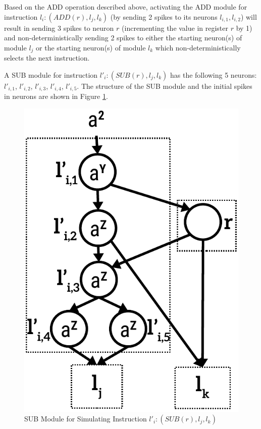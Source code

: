 \documentclass[smallextended]{svjour3}
\begin{document}
Based on the ADD operation described above, activating the ADD module for instruction $l_i:(ADD(r),l_j,l_k)$ (by sending 2 spikes to its neurons 
$l_{i,1}, l_{i,2}$) will result in sending $3$ spikes to neuron $r$ (incrementing the value in register $r$ by 1) and non-deterministically sending 2
spikes to either the starting neuron(s) of module $l_{j}$ or the starting neuron(s) of module $l_k$ which non-deterministically selects the next 
instruction. 


A SUB module for instruction $l'_i:(SUB(r), l_j, l_k)$ has the following 5 neurons: $l'_{i,1}$, $l'_{i,2}$, $l'_{i,3}$, $l'_{i,4}$, $l'_{i,5}$.
The structure of the SUB module and the initial spikes in neurons are shown in Figure \ref{fig-sub}. 

\begin{figure}
\begin{center}
\includegraphics[scale=0.50]{Fig2.pdf}
\caption{SUB Module for Simulating Instruction $l'_i:(SUB(r), l_j, l_k)$}
\label{fig-sub}
\end{center}
\end{figure}   
\end{document}
